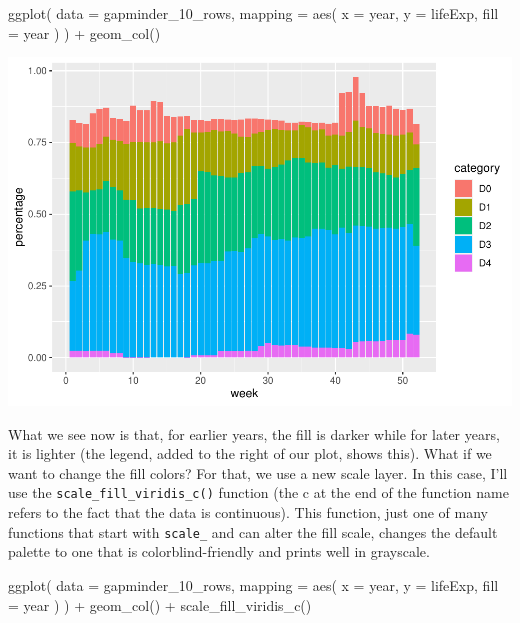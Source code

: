\documentclass[
]{book}
\newenvironment{Shaded}{\begin{snugshade}}{\end{snugshade}}
\newcommand{\AttributeTok}[1]{\textcolor[rgb]{0.77,0.63,0.00}{#1}}
\newcommand{\FunctionTok}[1]{\textcolor[rgb]{0.00,0.00,0.00}{#1}}
\newcommand{\NormalTok}[1]{#1}
\newcommand{\SpecialCharTok}[1]{\textcolor[rgb]{0.00,0.00,0.00}{#1}}
\begin{document}
\begin{Shaded}
\begin{Highlighting}[]
\FunctionTok{ggplot}\NormalTok{(}
  \AttributeTok{data =}\NormalTok{ gapminder\_10\_rows,}
  \AttributeTok{mapping =} \FunctionTok{aes}\NormalTok{(}
    \AttributeTok{x =}\NormalTok{ year,}
    \AttributeTok{y =}\NormalTok{ lifeExp,}
    \AttributeTok{fill =}\NormalTok{ year}
\NormalTok{  )}
\NormalTok{) }\SpecialCharTok{+}
  \FunctionTok{geom\_col}\NormalTok{()}
\end{Highlighting}
\end{Shaded}

\includegraphics[width=1\linewidth]{data-viz_files/figure-latex/unnamed-chunk-20-1}

What we see now is that, for earlier years, the fill is darker while for later years, it is lighter (the legend, added to the right of our plot, shows this). What if we want to change the fill colors? For that, we use a new scale layer. In this case, I'll use the \texttt{scale\_fill\_viridis\_c()} function (the c at the end of the function name refers to the fact that the data is continuous). This function, just one of many functions that start with \texttt{scale\_} and can alter the fill scale, changes the default palette to one that is colorblind-friendly and prints well in grayscale.

\begin{Shaded}
\begin{Highlighting}[]
\FunctionTok{ggplot}\NormalTok{(}
  \AttributeTok{data =}\NormalTok{ gapminder\_10\_rows,}
  \AttributeTok{mapping =} \FunctionTok{aes}\NormalTok{(}
    \AttributeTok{x =}\NormalTok{ year,}
    \AttributeTok{y =}\NormalTok{ lifeExp,}
    \AttributeTok{fill =}\NormalTok{ year}
\NormalTok{  )}
\NormalTok{) }\SpecialCharTok{+}
  \FunctionTok{geom\_col}\NormalTok{() }\SpecialCharTok{+}
  \FunctionTok{scale\_fill\_viridis\_c}\NormalTok{()}
\end{Highlighting}
\end{Shaded}
\end{document}

